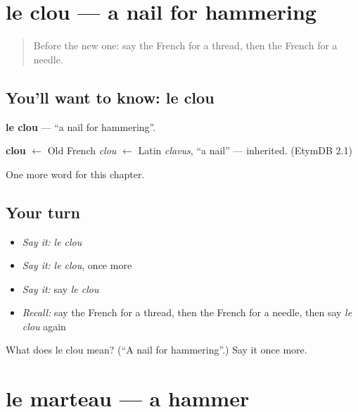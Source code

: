 \section[le clou]{le clou — a nail for hammering}

\label{lesson:FR-C230-clou}



\begin{quote}
Before the new one: say the French for a thread, then the French for a needle.
\end{quote}

\subsection*{You'll want to know: le clou}
\textbf{le clou} — \textquotedblleft{}a nail for hammering\textquotedblright{}.

\begin{cousinweb}
\textbf{clou} $\leftarrow$ Old French \emph{clou} $\leftarrow$ Latin \emph{clavus}, \textquotedblleft{}a nail\textquotedblright{} — inherited. (EtymDB 2.1)
\end{cousinweb}

\begin{grammarlens}[title={What you've built}]
One more word for this chapter.
\end{grammarlens}

\subsection*{Your turn}
\begin{itemize}
\raggedright
  \item \emph{Say it:} \emph{le clou}
  \item \emph{Say it:} \emph{le clou}, once more
  \item \emph{Say it:} say \emph{le clou}
  \item \emph{Recall:} say the French for a thread, then the French for a needle, then say \emph{le clou} again
\end{itemize}

\begin{tcolorbox}[breakable,colback=teal!4,colframe=teal!35!black,title={Before you move on}]
What does le clou mean? (\textquotedblleft{}A nail for hammering\textquotedblright{}.) Say it once more.
\end{tcolorbox}
\section[le marteau]{le marteau — a hammer}

